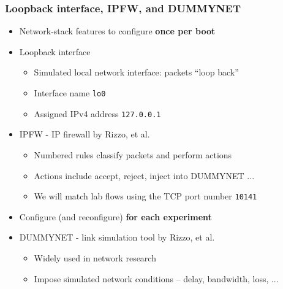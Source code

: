\begin{frame}[fragile]
  \frametitle{Loopback interface, IPFW, and DUMMYNET}

  \begin{itemize}
    \item Network-stack features to configure \textbf{once per boot}

    \pause

    \item Loopback interface
    \begin{itemize}
      \item Simulated local network interface: packets ``loop back''
      \item Interface name \texttt{lo0}
      \item Assigned IPv4 address \texttt{127.0.0.1}
    \end{itemize}

    \pause

    \item IPFW - IP firewall by Rizzo, et al.
    \begin{itemize}
      \item Numbered rules classify packets and perform actions
      \item Actions include accept, reject, inject into DUMMYNET ...
      \item We will match lab flows using the TCP port number \texttt{10141}
    \end{itemize}

    \medskip
    \pause

    \item Configure (and reconfigure) \textbf{for each experiment}
    \item DUMMYNET - link simulation tool by Rizzo, et al.
    \begin{itemize}
      \item Widely used in network research
      \item Impose simulated network conditions -- delay, bandwidth, loss, ...
    \end{itemize}
  \end{itemize}
\end{frame}

